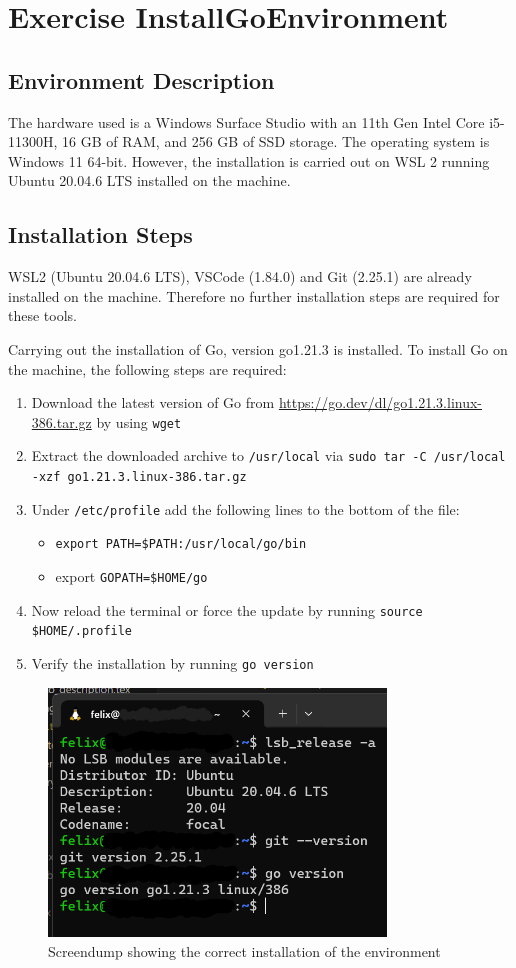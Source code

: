 \label{sec:exercise_install_go_env}

\section{Exercise InstallGoEnvironment}

\subsection{Environment Description}
The hardware used is a Windows Surface Studio with an 11th Gen Intel Core i5-11300H, 16 GB of RAM, and 256 GB of SSD storage.
The operating system is Windows 11 64-bit. However, the installation is carried out on WSL 2 running Ubuntu 20.04.6 LTS installed on the machine.

\subsection{Installation Steps}
WSL2 (Ubuntu 20.04.6 LTS), VSCode (1.84.0) and Git (2.25.1) are already installed on the machine. Therefore no further installation steps are required for these tools.

Carrying out the installation of Go, version go1.21.3 is installed.
To install Go on the machine, the following steps are required:
\begin{enumerate}
    \item Download the latest version of Go from \url{https://go.dev/dl/go1.21.3.linux-386.tar.gz} by using  \texttt{wget}
    \item Extract the downloaded archive to \texttt{/usr/local} via \texttt{sudo tar -C /usr/local -xzf go1.21.3.linux-386.tar.gz}
    \item Under \texttt{/etc/profile} add the following lines to the bottom of the file: 
    \begin{itemize}
        \item \texttt{export PATH=\$PATH:/usr/local/go/bin}
        \item export \texttt{GOPATH=\$HOME/go}
    \end{itemize}
    \item Now reload the terminal or force the update by running \texttt{source \$HOME/.profile}
    \item Verify the installation by running \texttt{go version}
\end{enumerate}

\begin{figure}[h]
	\centering
	\includegraphics[width=0.8\textwidth]{figures/installation_screendump.png}
	\caption{Screendump showing the correct installation of the environment}
	\label{fig:screendump_installation}
\end{figure}